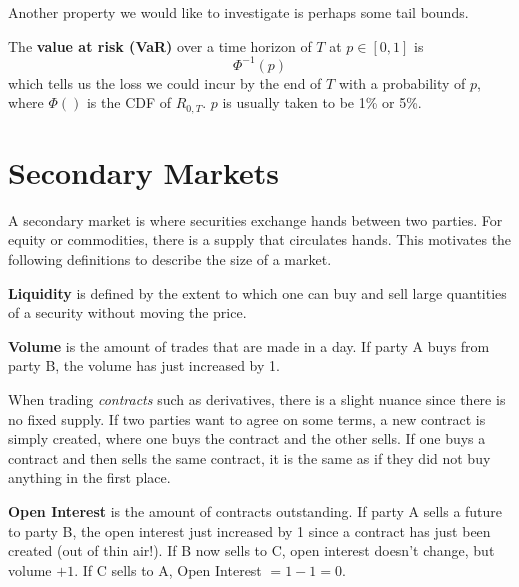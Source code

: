 \documentclass{article}
\begin{document}
    Another property we would like to investigate is perhaps some tail bounds. 

    \begin{definition}
      \label{def:value-at-risk}
      The \textbf{value at risk (VaR)} over a time horizon of $T$ at $p \in [0, 1]$ is 
      \begin{equation}
        \Phi^{-1}(p)
      \end{equation}
      which tells us the loss we could incur by the end of $T$ with a probability of $p$, where $\Phi()$ is the CDF of $R_{0, T}$. $p$ is usually taken to be 1\% or 5\%. 
    \end{definition}

\section{Secondary Markets}

    A secondary market is where securities exchange hands between two parties. For equity or commodities, there is a supply that circulates hands. This motivates the following definitions to describe the size of a market. 

    \begin{definition}[Liquidity]
      \label{def:liquidity}
      \textbf{Liquidity} is defined by the extent to which one can buy and sell large quantities of a security without moving the price. 
    \end{definition}

    \begin{definition}[Volume]
      \label{def:volume}
      \textbf{Volume} is the amount of trades that are made in a day. If party A buys from party B, the volume has just increased by 1. 
    \end{definition}

    When trading \textit{contracts} such as derivatives, there is a slight nuance since there is no fixed supply. If two parties want to agree on some terms, a new contract is simply created, where one buys the contract and the other sells. If one buys a contract and then sells the same contract, it is the same as if they did not buy anything in the first place. 

    \begin{definition}
      \label{def:open-interest}
      \textbf{Open Interest} is the amount of contracts outstanding. If party A sells a future to party B, the open interest just increased by 1 since a contract has just been created (out of thin air!). If B now sells to C, open interest doesn't change, but volume $+1$. If C sells to A, Open Interest $= 1 - 1 = 0$.  
    \end{definition}
\end{document}
